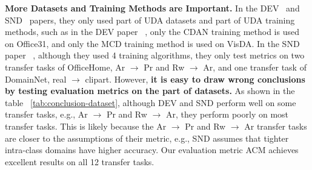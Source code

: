 \documentclass{article} %
\begin{document}
\textbf{More Datasets and Training Methods are Important.}
In the DEV~\cite{DEV} and SND~\cite{SND} papers, they only used part of UDA datasets and part of UDA training methods, such as in the DEV paper ~\cite{DEV}, only the CDAN training method is used on Office31, and only the MCD training method is used on VisDA. In the SND paper ~\cite{SND}, although they used 4 training algorithms, they only test metrics on two transfer tasks of OfficeHome, Ar $\to$ Pr and Rw $\to$ Ar, and one transfer task of DomainNet, real $\to$ clipart.
However, \textbf{it is easy to draw wrong conclusions by testing evaluation metrics on the part of datasets.} 
As shown in the table ~\ref{tab:conclusion-dataset}, although DEV and SND perform well on some transfer tasks, e.g., Ar $\to$ Pr and Rw $\to$ Ar, they perform poorly on most transfer tasks. This is likely because the Ar $\to$ Pr and Rw $\to$ Ar transfer tasks are closer to the assumptions of their metric, e.g., SND assumes that tighter intra-class domains have higher accuracy. Our evaluation metric ACM achieves excellent results on all 12 transfer tasks. 

\iffalse
\begin{figure}[t]
	\centering
        \subfloat[Office31]{
		\texttt{[image: figures/visual\_office31\_method.png]}
	}
	\subfloat[OfficeHome]{
		\texttt{[image: figures/visual\_method.png]}
	}
	\subfloat[VisDA2017]{
		\texttt{[image: figures/visual\_visda\_method.png]}
	}
	\subfloat[DomainNet]{
		\texttt{[image: figures/visual\_domainnet\_method.png]}
	}
	\caption{On four datasets (a) Office31, (b) OfficeHome, (c) VisDA2017, and (d) DomainNet, for various training methods, the average value of each metric. For display convenience, we normalize each metric to [0,1].}
	\label{fig:conclusion-method}
\end{figure}
\fi
\end{document}
